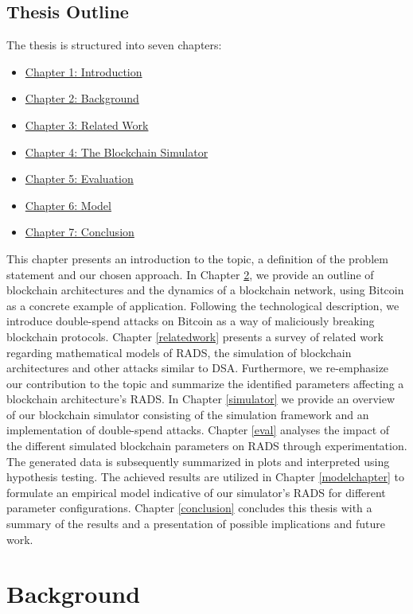 \documentclass[a4paper,12pt,twoside]{report}
\begin{document}
\section{Thesis Outline}
The thesis is structured into seven chapters:
\begin{itemize}
\item \hyperref[intro]{Chapter 1: Introduction}
\item \hyperref[background]{Chapter 2: Background}
\item \hyperref[relatedwork]{Chapter 3: Related Work}
\item \hyperref[simulator]{Chapter 4: The Blockchain Simulator}
\item \hyperref[eval]{Chapter 5: Evaluation}
\item \hyperref[modelchapter]{Chapter 6: Model}
\item \hyperref[conclusion]{Chapter 7: Conclusion}
\end{itemize}
This chapter presents an introduction to the topic, a definition of the problem statement and our chosen approach. In Chapter \ref{background}, we provide an outline of blockchain architectures and the dynamics of a blockchain network, using Bitcoin as a concrete example of application. Following the technological description, we introduce double-spend attacks on Bitcoin as a way of maliciously breaking blockchain protocols. Chapter \ref{relatedwork} presents a survey of related work regarding mathematical models of RADS, the simulation of blockchain architectures and other attacks similar to DSA. Furthermore, we re-emphasize our contribution to the topic and summarize the identified parameters affecting a blockchain architecture's RADS. In Chapter \ref{simulator} we provide an overview of our blockchain simulator consisting of the simulation framework and an implementation of double-spend attacks. Chapter \ref{eval} analyses the impact of the different simulated blockchain parameters on RADS through experimentation. The generated data is subsequently summarized in plots and interpreted using hypothesis testing. The achieved results are utilized in Chapter \ref{modelchapter} to formulate an empirical model indicative of our simulator's RADS for different parameter configurations. Chapter \ref{conclusion} concludes this thesis with a summary of the results and a presentation of possible implications and future work.


\chapter{Background} \label{background}
\end{document}
